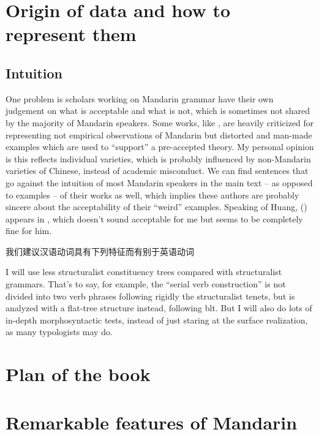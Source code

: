 \documentclass[UTF8, a4paper, oneside, scheme=plain]{ctexrep}
\begin{document}
\section{Origin of data and how to represent them}

\subsection{Intuition}

One problem is scholars working on Mandarin grammar 
have their own judgement on what is acceptable and what is not, 
which is sometimes not shared by the majority of Mandarin speakers.
Some works, like \citet{huang2013}, 
are heavily criticized for 
representing not empirical observations of Mandarin
but distorted and man-made examples 
which are used to ``support'' a pre-accepted theory.
My personal opinion is this reflects individual varieties, 
which is probably influenced by non-Mandarin varieties of Chinese,
instead of academic misconduct.
We can find sentences that go against the intuition of most Mandarin speakers 
in the main text -- as opposed to examples -- of their works as well, 
which implies these authors are probably 
sincere about the acceptability of their ``weird'' examples.
Speaking of Huang, () appears in \citet{huang2007},
which doesn't sound acceptable for me but seems to be completely fine for him.

\begin{exe}
    \ex\label{ex:weird-1} 我们建议汉语动词具有下列特征而有别于英语动词 \citep{huang2007}
\end{exe}

I will use less structuralist constituency trees compared with structuralist grammars.
That's to say, for example, 
the ``serial verb construction'' is not divided into two verb phrases 
following rigidly the structuralist tenets,
but is analyzed with a flat-tree structure instead,
following \acs{blt}.
But I will also do lots of in-depth morphosyntactic tests,
instead of just staring at the surface realization,
as many typologists may do.


\section{Plan of the book}

\section{Remarkable features of Mandarin}
\end{document}
